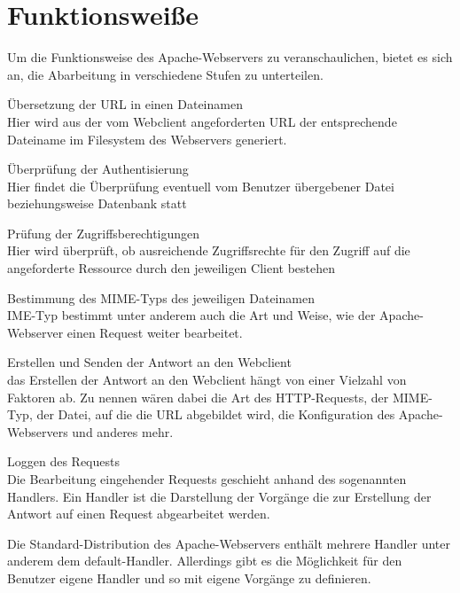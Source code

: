 \documentclass[a4paper, 11pt]{article}
\begin{document}
\newpage



\section{Funktionsweiße}
Um die Funktionsweise des Apache-Webservers zu veranschaulichen, bietet es 
sich an, die Abarbeitung in verschiedene Stufen zu unterteilen.
\begin{description}

\item{Übersetzung der URL in einen Dateinamen\\  Hier wird aus der vom 
Webclient angeforderten URL der entsprechende Dateiname im Filesystem 
des Webservers generiert.}

\item{Überprüfung der Authentisierung \\ Hier findet die Überprüfung eventuell 
vom Benutzer übergebener Datei beziehungsweise Datenbank statt}

\item{Prüfung der Zugriffsberechtigungen \\Hier wird überprüft, ob ausreichende 
Zugriffsrechte für den Zugriff auf die angeforderte Ressource durch den jeweiligen Client bestehen}

\item{Bestimmung des MIME-Typs des jeweiligen Dateinamen \\IME-Typ bestimmt unter anderem auch die Art und Weise, wie der Apache-Webserver einen Request weiter 
bearbeitet.  }

\item{Erstellen und Senden der Antwort an den Webclient \\ das Erstellen der 
Antwort an den Webclient hängt von einer Vielzahl von Faktoren 
ab. Zu nennen wären dabei die Art des HTTP-Requests, der MIME-Typ, der Datei, auf die die URL abgebildet wird, die Konfiguration des Apache-Webservers und anderes mehr.}


\item{Loggen des Requests \\ Die Bearbeitung eingehender Requests geschieht anhand des sogenannten Handlers. Ein Handler ist die Darstellung der Vorgänge die zur Erstellung der Antwort auf einen Request abgearbeitet werden. }
\end{description}
Die Standard-Distribution des Apache-Webservers enthält mehrere Handler unter anderem dem default-Handler. Allerdings gibt es die Möglichkeit für den Benutzer eigene Handler und so mit eigene Vorgänge zu definieren.
\end{document}
